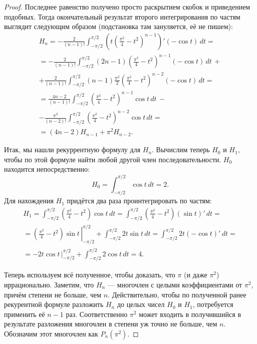 \begin{proof}
	Последнее равенство получено просто раскрытием скобок и приведением подобных. Тогда окончательный результат второго интегрирования по частям выглядит следующим образом (подстановка там зануляется, её не пишем):
	\begin{multline*}
		H_n = -\frac{2}{(n-1)!} \int_{-\pi/2}^{\pi/2} \left(t \left(\frac{\pi^2}{4} - t^2 \right)^{n-1} \right)' (-\cos t) \, dt = \\
		= -\frac{2}{(n-1)!} \int_{-\pi/2}^{\pi/2} (2n - 1) \left(\frac{\pi^2}4 - t^2 \right)^{n-1} (-\cos t) \, dt \, + \\
		+ \frac{2}{(n-1)!} \int_{-\pi/2}^{\pi/2} (n - 1) \frac{\pi^2}2 \left(\frac{\pi^2}4 - t^2 \right)^{n - 2} (-\cos t) \, dt = \\
		= \frac{4n-2}{(n-1)!} \int_{-\pi/2}^{\pi/2} \left(\frac{\pi^2}4 - t^2 \right)^{n-1} \cos t \, dt \, - \\
		- \frac{\pi^2}{(n-2)!} \int_{-\pi/2}^{\pi/2} \left(\frac{\pi^2}4 - t^2 \right)^{n-2} \cos t \, dt = \\
		= (4n - 2) H_{n - 1} + \pi^2 H_{n - 2}.
	\end{multline*}
	
	Итак, мы нашли рекуррентную формулу для \(H_n\).
	Вычислим теперь \(H_0\) и \(H_1\), чтобы по этой формуле найти любой другой член последовательности.
	\(H_0\) находится непосредственно: \[
		H_0 = \int_{-\pi/2}^{\pi/2} \cos t \, dt = 2.
	\]
	Для нахождения \(H_1\) придётся два раза проинтегрировать по частям:
	\begin{multline*}
		H_1 = \int_{-\pi/2}^{\pi/2} \left(\frac{\pi^2}4 - t^2 \right) \cos t \, dt = \int_{-\pi/2}^{\pi/2} \left(\frac{\pi^2}4 - t^2 \right) (\sin t)' \, dt = \\
		= \left. \left(\frac{\pi^2}4 - t^2 \right) \sin t \, \right|_{-\pi/2}^{\pi/2} + \int_{-\pi/2}^{\pi/2} 2t \sin t \, dt = \int_{-\pi/2}^{\pi/2} 2t (-\cos t)' \, dt = \\
		= -2t \cos t \, \bigg|_{-\pi/2}^{\pi/2} + \int_{-\pi/2}^{\pi/2} 2\cos t \, dt = 4.
	\end{multline*}

	Теперь используем всё полученное, чтобы доказать, что \(\pi\) (и даже \(\pi^2\)) иррационально.
	Заметим, что \(H_n\) --- многочлен с целыми коэффициентами от \(\pi^2\), причём степени не больше, чем \(n\).
	Действительно, чтобы по полученной ранее рекурентной формуле разложить \(H_n\) до целых чисел \(H_0\) и \(H_1\), потребуется применить её \(n - 1\) раз.
	Соответственно \(\pi^2\) может входить в получившийся в результате разложения многочлен в степени уж точно не больше, чем \(n\). Обозначим этот многочлен как \(P_n(\pi^2)\).
	

\end{proof}

